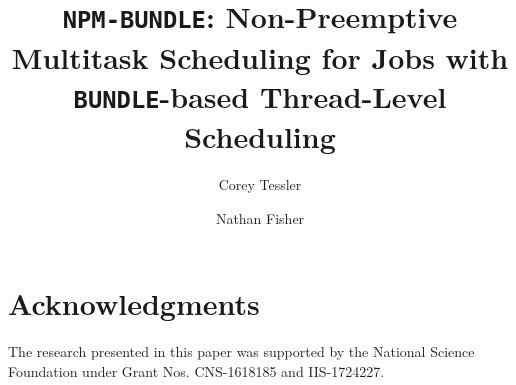 \documentclass[a4paper,USenglish,english]{lipics-v2018}
\title{\texttt{NPM-BUNDLE}: Non-Preemptive Multitask Scheduling for
  Jobs with \texttt{BUNDLE}-based Thread-Level Scheduling}
\author{Corey Tessler}
       {Wayne State University, Detroit, Michigan, United States}
       {corey.tessler@wayne.edu}
       {}
       {}
\author{Nathan Fisher}
       {Wayne State University, Detroit, Michigan, United States}
       {fishern@wayne.edu}
       {}
       {}
\begin{document}
\maketitle







% 



\section{Acknowledgments}

The research presented in this paper was supported by the National
Science Foundation under Grant Nos. CNS-1618185 and IIS-1724227.


\end{document}
